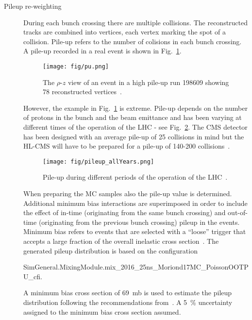 \begin{description}

\item[Pileup re-weighting]

During each bunch crossing there are multiple \Pp\Pp collisions. The reconstructed tracks are combined into vertices, each vertex marking the spot of a \Pp\Pp collision. Pile-up refers to the number of \Pp\Pp colisions in each bunch crossing. A pile-up recorded in a real event is shown in Fig.~\ref{fig:pu}.

\begin{figure}[htp]
\centering
\texttt{[image: fig/pu.png]}
\caption{The $\rho$-$z$ view of an event in a high pile-up run 198609 showing 78 reconstructed vertices~\cite{Holzner:pu}.}
\label{fig:pu}
\end{figure}

However, the example in Fig.~\ref{fig:pu} is extreme. Pile-up depends on the number of protons in the bunch and the beam emittance and has been varying at different times of the operation of the LHC - see Fig.~\ref{fig:pileup_allYears}. The CMS detector has been designed with an average pile-up of 25 collisions in mind but the HL-CMS will have to be prepared for a pile-up of 140-200 collisions~\cite{Apollinari:2015bam}.

\begin{figure}[htp]
\centering
\texttt{[image: fig/pileup\_allYears.png]}
\caption{Pile-up during different periods of the operation of the LHC~\cite{twiki:pu_public}.}
\label{fig:pileup_allYears}
\end{figure}

When preparing the MC samples also the pile-up value is determined. Additional minimum bias interactions are superimposed in order to include the effect of in-time (originating from the same bunch crossing) and out-of-time (originating from the previous bunch crossing) pileup in the events. Minimum bias refers to events that are selected with a “loose” trigger that accepts a large fraction of the overall inelastic cross section~\cite{Field:2011iq}. The generated pileup distribution is based on the configuration

SimGeneral.MixingModule.mix\_2016\_25ns\_Moriond17MC\_PoissonOOTPU\_cfi.

A minimum bias cross section of 69~mb is used to estimate the pileup distribution following the recommendations from~\cite{twiki:pileup}. A 5~\% uncertainty assigned to the minimum bias cross section assumed.


\end{description}
